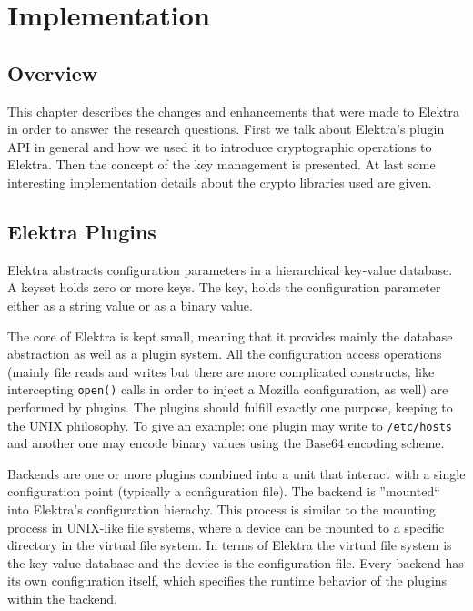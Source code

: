 \chapter{Implementation}

\section{Overview}

This chapter describes the changes and enhancements that were made to
Elektra in order to answer the research questions.
First we talk about Elektra's plugin API in general and how we used it
to introduce cryptographic operations to Elektra. Then the concept of
the key management is presented. At last some interesting implementation
details about the crypto libraries used are given.

\section{Elektra Plugins}\label{elektra-plugins}

Elektra abstracts configuration parameters in a hierarchical key-value
database. A keyset holds zero or more keys. The key‚ holds the
configuration parameter either as a string value or as a binary value.

The core of Elektra is kept small, meaning that it provides mainly the
database abstraction as well as a plugin system. All the configuration
access operations (mainly file reads and writes but there are more
complicated constructs, like intercepting \texttt{open()} calls in
order to inject a Mozilla configuration, as well) are performed by
plugins. The plugins should fulfill exactly one purpose, keeping to the
UNIX philosophy. To give an example: one plugin may write to
\texttt{/etc/hosts} and another one may encode binary values using the
Base64 encoding scheme.

Backends are one or more plugins combined into a unit that interact with a single configuration point (typically a configuration file).
The backend is ''mounted`` into Elektra's configuration hierachy.
This process is similar to the mounting process in UNIX-like file systems, where a device can be mounted to a specific directory in the virtual file system.
In terms of Elektra the virtual file system is the key-value database and the device is the configuration file.
Every backend has its own configuration itself, which specifies the runtime behavior of the plugins within the backend.

